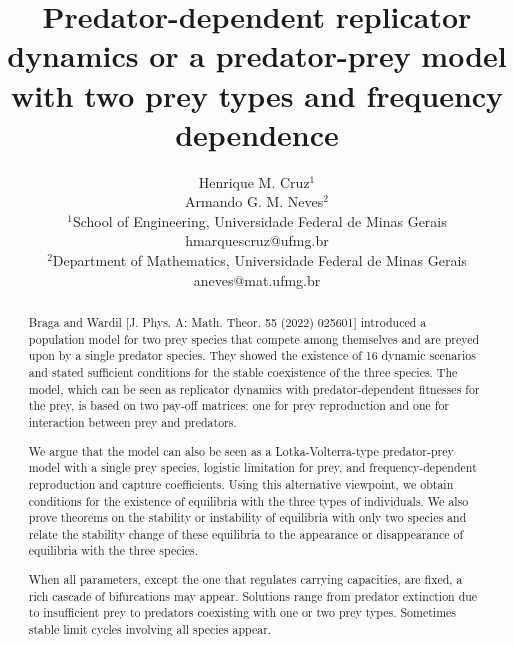 \documentclass[12pt]{article}
\theoremstyle{definition}
\begin{document}
	\title{Predator-dependent replicator dynamics or a predator-prey model with two prey types and frequency dependence}
	\author{Henrique M. Cruz$^{1}$\\ Armando G. M. Neves$^{2}$
	\\
	\normalsize{$^{1}$School of Engineering, Universidade Federal de Minas Gerais}
	\\ 	\normalsize{hmarquescruz@ufmg.br}\\
	\normalsize{$^{2}$Department of Mathematics, Universidade Federal de Minas Gerais}
		\\ 	\normalsize{aneves@mat.ufmg.br}\\
}
	

	
\maketitle
	
	\begin{abstract}
		Braga and Wardil [J. Phys. A: Math. Theor. 55 (2022) 025601] introduced a population model for two prey species that compete among themselves and are preyed upon by a single predator species. They showed the existence of 16 dynamic scenarios and stated sufficient conditions for the stable coexistence of the three species. The model, which can be seen as replicator dynamics with predator-dependent fitnesses for the prey, is based on two pay-off matrices: one for prey reproduction and one for interaction between prey and predators.
		
		We argue that the model can also be seen as a Lotka-Volterra-type predator-prey model with a single prey species, logistic limitation for prey, and frequency-dependent reproduction and capture coefficients. Using this alternative viewpoint, we obtain conditions for the existence of equilibria with the three types of individuals. We also prove theorems on the stability or instability of equilibria with only two species and relate the stability change of these equilibria to the appearance or disappearance of equilibria with the three species.
		
		When all parameters, except the one that regulates carrying capacities, are fixed, a rich cascade of bifurcations may appear. Solutions range from predator extinction due to insufficient prey to predators coexisting with one or two prey types. Sometimes stable limit cycles involving all species appear.
		
	\end{abstract}
	
\end{document}
